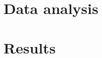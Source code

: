 \documentclass[
	12pt,				%
	oneside,			%
	a4paper,			%
	english,			%
	brazil				%
	]{abntex2ppgsi}
\begin{document}





\chapter{Data analysis}

\chapter{Results}
\end{document}
